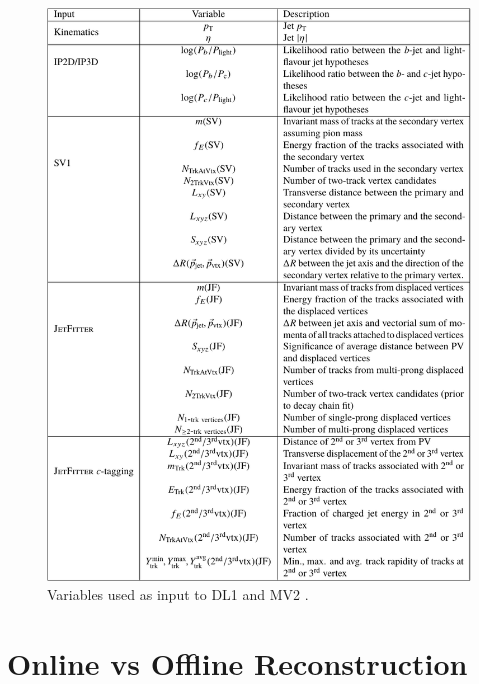             \begin{figure}[tbh] \center
                \includegraphics[width=\linewidth,height=\textheight,keepaspectratio]{tables/reconstruction/DL1_vars}
                \caption{
                    Variables used as input to DL1 and MV2 \cite{bjet_id_and_performance}.
                }
                \label{tab:DL1_vars}
            \end{figure}

    \FloatBarrier
    \section{Online vs Offline Reconstruction}

